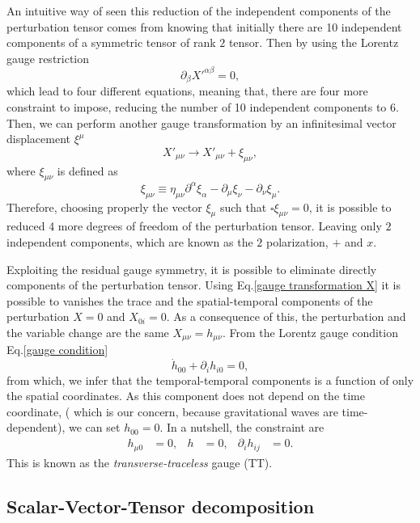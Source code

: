 \documentclass{article}
\begin{document}
An intuitive way of seen this reduction of the independent components of the
perturbation tensor comes from knowing that initially there are 10 independent
components of a symmetric tensor of rank $2$ tensor. Then by using the Lorentz
gauge restriction 
\begin{equation}
    \partial_{\beta}X'^{\alpha\beta} = 0,
\end{equation}
which lead to four different equations, meaning that, there are four more 
constraint to impose, reducing the number of 10 independent components to
6. Then, we can perform another gauge transformation by an infinitesimal
vector displacement $\xi^{\mu}$ 
\begin{equation}
    X'_{\mu\nu} \rightarrow X'_{\mu\nu} + \xi_{\mu\nu},
\end{equation}
where $\xi_{\mu\nu}$ is defined as 
\begin{equation}
    \xi_{\mu\nu} \equiv \eta_{\mu\nu}\partial^{\alpha}\xi_{\alpha} 
    -\partial_{\mu}\xi_{\nu} -\partial_{\nu}\xi_{\mu}.
\end{equation}
Therefore, choosing properly the vector $\xi_{\mu}$ such that $\square \xi_{\mu\nu} = 0$,
it is possible to reduced 4 more degrees of freedom of the perturbation 
tensor. Leaving only $2$ independent components, which are known as the $2$
polarization, $+$ and $x$.

Exploiting the residual gauge symmetry, it is possible to eliminate
directly components of the perturbation tensor. Using Eq.\eqref{gauge transformation X}
it is possible to vanishes the trace and the spatial-temporal components of the 
perturbation $X = 0$ and $X_{0i} = 0$. As a consequence of this, the perturbation
and the variable change are the same $X_{\mu\nu} = h_{\mu\nu}$. From the Lorentz gauge
condition Eq.\eqref{gauge condition}
\begin{equation}
    \dot{h}_{00} + \partial_{i}h_{i0} = 0,
\end{equation}
from which, we infer that the temporal-temporal components is a function of only
the spatial coordinates. As this component does not depend on the time coordinate, (
which is our concern, because gravitational waves are time-dependent), we can set 
$h_{00} = 0$. In a nutshell, the constraint are
\begin{align}
    h_{\mu 0 } & = 0, & h & = 0, & \partial_{i}h_{ij} & = 0.
\end{align}
This is known as the \textit{transverse-traceless} gauge (TT).


\subsection{Scalar-Vector-Tensor decomposition}
\end{document}
